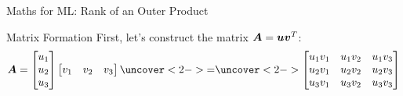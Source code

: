 \documentclass{beamer}
\begin{document}


\begin{frame}{Maths for ML: Rank of an Outer Product}
    \begin{keypointsbox}{Matrix Formation}
    First, let's construct the matrix $\bm{A} = \bm{u}\bm{v}^T$:
    $$
    \vecMat{A} = \begin{bmatrix} u_1 \\ u_2 \\ u_3 \end{bmatrix}
    \begin{bmatrix} v_1 & v_2 & v_3 \end{bmatrix}
    \uncover<2->{=}
    \uncover<2->{
    \begin{bmatrix}
        u_1v_1 & u_1v_2 & u_1v_3 \\
        u_2v_1 & u_2v_2 & u_2v_3 \\
        u_3v_1 & u_3v_2 & u_3v_3
    \end{bmatrix}
    }
    $$
    \end{keypointsbox}
\end{frame}
\end{document}
